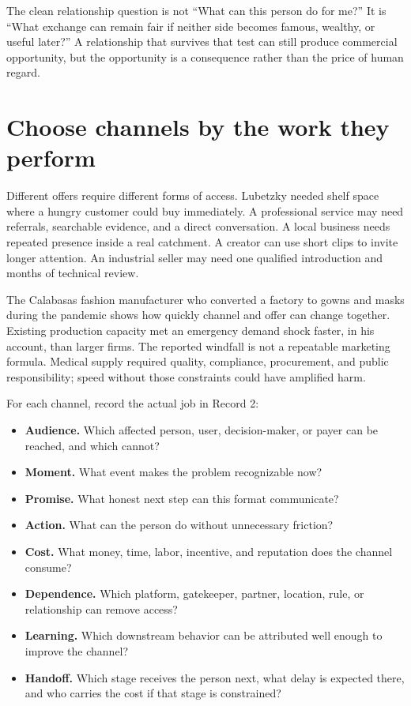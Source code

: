 The clean relationship question is not ``What can this person do for me?'' It
is ``What exchange can remain fair if neither side becomes famous, wealthy, or
useful later?'' A relationship that survives that test can still produce
commercial opportunity, but the opportunity is a consequence rather than the
price of human regard.

\section{Choose channels by the work they perform}

Different offers require different forms of access. Lubetzky needed shelf space
where a hungry customer could buy immediately. A professional service may need
referrals, searchable evidence, and a direct conversation. A local business
needs repeated presence inside a real catchment. A creator can use short clips
to invite longer attention. An industrial seller may need one qualified
introduction and months of technical review.

The Calabasas fashion manufacturer who converted a factory to gowns and masks
during the pandemic shows how quickly channel and offer can change together.
Existing production capacity met an emergency demand shock faster, in his
account, than larger firms. The reported windfall is not a repeatable marketing
formula. Medical supply required quality, compliance, procurement, and public
responsibility; speed without those constraints could have amplified harm.

For each channel, record the actual job in Record 2:

\begin{itemize}[leftmargin=1.5em,itemsep=0.15em]
\item \textbf{Audience.} Which affected person, user, decision-maker, or payer
  can be reached, and which cannot?
\item \textbf{Moment.} What event makes the problem recognizable now?
\item \textbf{Promise.} What honest next step can this format communicate?
\item \textbf{Action.} What can the person do without unnecessary friction?
\item \textbf{Cost.} What money, time, labor, incentive, and reputation does the
  channel consume?
\item \textbf{Dependence.} Which platform, gatekeeper, partner, location, rule,
  or relationship can remove access?
\item \textbf{Learning.} Which downstream behavior can be attributed well
  enough to improve the channel?
\item \textbf{Handoff.} Which stage receives the person next, what delay is
  expected there, and who carries the cost if that stage is constrained?
\end{itemize}

